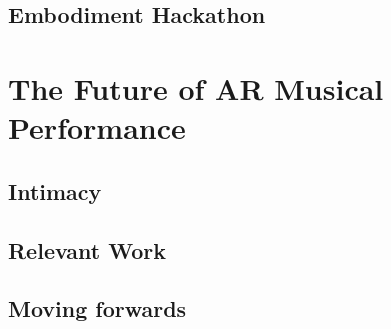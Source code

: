 \subsection{Embodiment Hackathon} \label{sec: polygons-demonstrations-emh}



\section{The Future of AR Musical Performance}
\subsection{Intimacy}
\subsection{Relevant Work}
\subsection{Moving forwards}